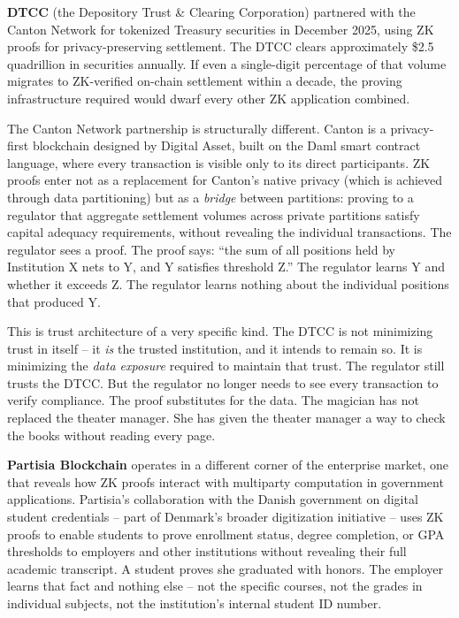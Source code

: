 \documentclass[
  11pt,
  openany]{report}
\renewcommand{\textbf}[1]{{\bfseries\color{MidnightBold}#1}}
\begin{document}
\textbf{DTCC} (the Depository Trust \& Clearing Corporation) partnered with the
Canton Network for tokenized Treasury securities in December 2025, using ZK
proofs for privacy-preserving settlement. The DTCC clears approximately \$2.5
quadrillion in securities annually. If even a single-digit percentage of that
volume migrates to ZK-verified on-chain settlement within a decade, the proving
infrastructure required would dwarf every other ZK application combined.

The Canton Network partnership is structurally different. Canton is a
privacy-first blockchain designed by Digital Asset, built on the Daml smart
contract language, where every transaction is visible only to its direct
participants. ZK proofs enter not as a replacement for Canton's native privacy
(which is achieved through data partitioning) but as a \emph{bridge} between
partitions: proving to a regulator that aggregate settlement volumes across
private partitions satisfy capital adequacy requirements, without revealing the
individual transactions. The regulator sees a proof. The proof says: ``the sum
of all positions held by Institution X nets to Y, and Y satisfies threshold Z.''
The regulator learns Y and whether it exceeds Z. The regulator learns nothing
about the individual positions that produced Y.

This is trust architecture of a very specific kind. The DTCC is not minimizing
trust in itself -- it \emph{is} the trusted institution, and it intends to
remain so. It is minimizing the \emph{data exposure} required to maintain that
trust. The regulator still trusts the DTCC. But the regulator no longer needs to
see every transaction to verify compliance. The proof substitutes for the data.
The magician has not replaced the theater manager. She has given the theater
manager a way to check the books without reading every page.

\textbf{Partisia Blockchain} operates in a different corner of the enterprise
market, one that reveals how ZK proofs interact with multiparty computation in
government applications. Partisia's collaboration with the Danish government on
digital student credentials -- part of Denmark's broader digitization initiative
-- uses ZK proofs to enable students to prove enrollment status, degree
completion, or GPA thresholds to employers and other institutions without
revealing their full academic transcript. A student proves she graduated with
honors. The employer learns that fact and nothing else -- not the specific
courses, not the grades in individual subjects, not the institution's internal
student ID number.
\end{document}
